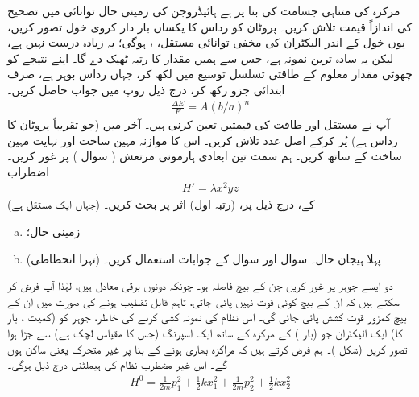 مرکزہ کی متناہی جسامت کی بنا پر ہے ہائیڈروجن کی زمینی حال توانائی میں تصحیح کی اندازاً قیمت تلاش کریں۔ پروٹان کو رداس  کا یکساں بار دار کروی خول تصور کریں، یوں خول کے اندر الیکٹران ‏کی مخفی توانائی مستقل، ، ہوگی؛ یہ زیادہ درست نہیں ہے، لیکن یہ سادہ ترین نمونہ ہے، جس سے ہمیں مقدار کا رتبہ ٹھیک دے گا۔ اپنے نتیجے کو چھوٹی مقدار معلوم  کے طاقتی تسلسل توسیع میں لکھ کر، جہاں  رداس بوہر ہے، صرف ابتدائی جزو رکھ کر، درج ذیل روپ میں جواب حاصل کریں۔ 
\begin{align*}
\frac{\Delta E}{E} = A (b/a)^n
\end{align*}
آپ نے مستقل  اور طاقت  کی قیمتیں تعین کرنی ہیں۔ آخر میں  (جو تقریباً پروٹان کا رداس ہے) پُر کرکے اصل عدد تلاش کریں۔ اس کا موازنہ مہین ساخت اور نہایت مہین ساخت کے ساتھ کریں۔ 
ہم سمت تین ابعادی ہارمونی مرتعش ( سوال ) پر غور کریں۔ اضطراب
\begin{align*} 
H' = \lambda x^2 y z
\end{align*}
(جہاں  ایک مستقل ہے) کے، درج ذیل پر، (رتبہ اول) اثر پر بحث کریں۔ 
\begin{enumerate}[a.]
\item
زمینی حال؛
\item
(تہرا انحطاطی) پہلا ہیجان حال۔  سوال  اور سوال  کے جوابات استعمال کریں۔ 
\end{enumerate}
 دو ایسے جوہر پر غور کریں جن کے بیچ فاصلہ  ہو۔ چونکہ دونوں برقی معادل ہیں، لہٰذا آپ فرض کر سکتے ہیں کہ ان کے بیچ کوئی قوت نہیں پائی جاتی، تاہم قابل تقطیب ہونے کی صورت میں ان کے بیچ کمزور قوت کشش پائی جائی گی۔ اس نظام کی نمونہ کشی کرنے کی خاطر، جوہر کو (کمیت ، بار  کا) ایک الیکٹران جو (بار ) کے مرکزہ کے ساتھ ایک اسپرنگ (جس کا مقیاس لچک  ہے) سے جڑا ہوا تصور کریں (شکل )۔ ہم فرض کرتے ہیں کہ مراکزہ بھاری ہونے کے بنا پر غیر متحرک یعنی ساکن ہوں گے۔ اس غیر مضطرب نظام کی ہیملٹنی درج ذیل ہوگی۔
\begin{align}\label{مساوات_غیر_مضطرب_جوہر_کل_ہیملٹنی}
H^0 = \frac{1}{2m} p_1^2 + \frac{1}{2} k x_1^2 + \frac{1}{2m} p_2^2 + \frac{1}{2} k x_2^2
\end{align}
